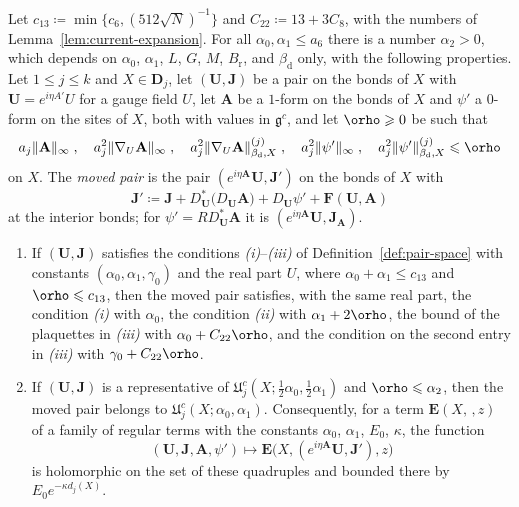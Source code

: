 \documentclass[11pt]{preprint}
\makeatletter
\let\rho\orho
\DeclarePairedDelimiter{\norm}{\lVert}{\rVert}
\newcommand*{\bigcdot}{}%
\DeclareRobustCommand*{\bigcdot}{%
	\mathbin{\mathpalette\bigcdot@{}}%
}
\newcommand*{\bigcdot@scalefactor}{.7}
\newcommand*{\bigcdot@widthfactor}{1.15}
\newcommand*{\bigcdot@}[2]{%
	\sbox0{$#1\vcenter{}$}%
	\sbox2{$#1\cdot\m@th$}%
	\hbox to \bigcdot@widthfactor\wd2{%
		\hss
		\raise\ht0\hbox{%
			\scalebox{\bigcdot@scalefactor}{%
				\lower\ht0\hbox{$#1\bullet\m@th$}%
			}%
		}%
		\hss
	}%
}
\numberwithin{equation}{section}
\makeatother
\begin{document}
\begin{proposition}\label{prop:space-stability}
Let $c_{13} \coloneqq \min\{ c_6, (512\sqrt N)^{-1} \}$ and $C_{22} \coloneqq 13 + 3C_8$, with the numbers of Lemma~\ref{lem:current-expansion}. For all $\alpha_0, \alpha_1 \leqslant a_6$ there is a number $\alpha_2 > 0$, which depends on $\alpha_0$, $\alpha_1$, $L$, $G$, $M$, $B_{\mathrm r}$, and $\beta_{\mathrm d}$ only, with the following properties. Let $1 \leqslant j \leqslant k$ and $X \in \mathbf D_j$, let $(\mathbf U, \mathbf J)$ be a pair on the bonds of $X$ with $\mathbf U = e^{i\eta A'}U$ for a gauge field $U$, let $\mathbf A$ be a $1$-form on the bonds of $X$ and $\psi'$ a $0$-form on the sites of $X$, both with values in $\mathfrak g^c$, and let $\rho \geqslant 0$ be such that
\begin{equation}\label{eq:shift-domain}
    a_j\norm{\mathbf A}_\infty\;,\quad
    a_j^2\norm{\nabla_U\mathbf A}_\infty\;,\quad
    a_j^2\norm{\nabla_U\mathbf A}^{(j)}_{\beta_{\mathrm d},X}\;,\quad
    a_j^2\norm{\psi'}_\infty\;,\quad
    a_j^2\norm{\psi'}^{(j)}_{\beta_{\mathrm d},X} \leqslant \rho
\end{equation}
on $X$. The \emph{moved pair} is the pair $(e^{i\eta\mathbf A}\mathbf U, \mathbf J')$ on the bonds of $X$ with
\begin{equation}\label{eq:moved-pair}
    \mathbf J' \coloneqq \mathbf J + D^*_{\mathbf U}\bigl(D_{\mathbf U}\mathbf A\bigr) + D_{\mathbf U}\psi' + \mathbf F(\mathbf U, \mathbf A)
\end{equation}
at the interior bonds; for $\psi' = RD^*_{\mathbf U}\mathbf A$ it is $(e^{i\eta\mathbf A}\mathbf U, \mathbf J_{\mathbf A})$.
\begin{enumerate}[label=(\roman*)]
\item If $(\mathbf U, \mathbf J)$ satisfies the conditions \emph{(i)}--\emph{(iii)} of Definition~\ref{def:pair-space} with constants $(\alpha_0, \alpha_1, \gamma_0)$ and the real part $U$, where $\alpha_0 + \alpha_1 \leqslant c_{13}$ and $\rho \leqslant c_{13}$, then the moved pair satisfies, with the same real part, the condition \emph{(i)} with $\alpha_0$, the condition \emph{(ii)} with $\alpha_1 + 2\rho$, the bound of the plaquettes in \emph{(iii)} with $\alpha_0 + C_{22}\rho$, and the condition on the second entry in \emph{(iii)} with $\gamma_0 + C_{22}\rho$.
\item If $(\mathbf U, \mathbf J)$ is a representative of $\mathfrak U^c_j(X; \frac{1}{2}\alpha_0, \frac{1}{2}\alpha_1)$ and $\rho \leqslant \alpha_2$, then the moved pair belongs to $\mathfrak U^c_j(X; \alpha_0, \alpha_1)$. Consequently, for a term $\mathbf E(X, \bigcdot\,, z)$ of a family of regular terms with the constants $\alpha_0$, $\alpha_1$, $E_0$, $\kappa$, the function
\begin{equation}\label{eq:shifted-term}
    (\mathbf U, \mathbf J, \mathbf A, \psi') \longmapsto \mathbf E\bigl(X, (e^{i\eta\mathbf A}\mathbf U, \mathbf J'), z\bigr)
\end{equation}
is holomorphic on the set of these quadruples and bounded there by $E_0e^{-\kappa d_j(X)}$.
\end{enumerate}
\end{proposition}
\end{document}
